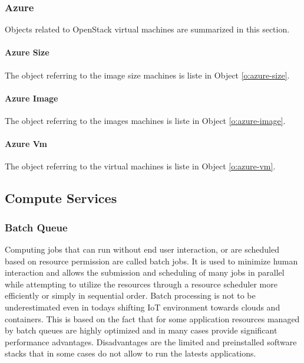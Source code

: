 \documentclass[10pt]{article}
\begin{document}
\subsubsection{Azure}\label{S:azure}

Objects related to OpenStack virtual machines are summarized in this
section.

\paragraph{Azure Size}

The object referring to the image size machines is liste in Object \ref{o:azure-size}.



\paragraph{Azure Image}

The object referring to the images machines is liste in Object
\ref{o:azure-image}.


\paragraph{Azure Vm}

The object referring to the virtual machines is liste in Object
\ref{o:azure-vm}.
 


\subsection{Compute Services}

\subsubsection{Batch Queue}

Computing jobs that can run without end user interaction, or are
scheduled based on resource permission are called batch jobs. It is
used to minimize human interaction and allows the submission and
scheduling of many jobs in parallel while attempting to utilize the
resources through a resource scheduler more efficiently or simply in
sequential order. Batch processing is not to be underestimated even in
todays shifting IoT environment towards clouds and containers. This is
based on the fact that for some application resources managed by batch
queues are highly optimized and in many cases provide significant
performance advantages. Disadvantages are the limited and preinstalled
software stacks that in some cases do not allow to run the latests
applications.
\end{document}
